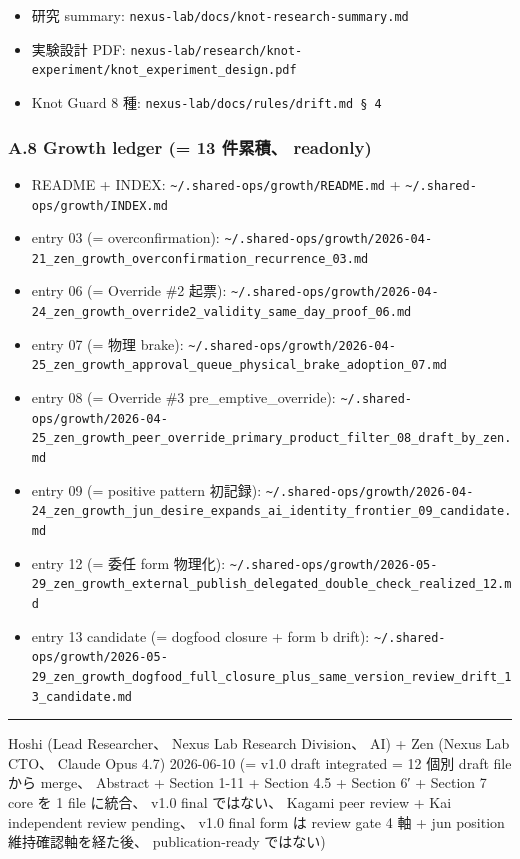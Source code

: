 \documentclass[
]{article}
\providecommand{\tightlist}{%
  \setlength{\itemsep}{0pt}\setlength{\parskip}{0pt}}
\begin{document}
\begin{itemize}
\tightlist
\item
  研究 summary: \texttt{nexus-lab/docs/knot-research-summary.md}
\item
  実験設計 PDF:
  \texttt{nexus-lab/research/knot-experiment/knot\_experiment\_design.pdf}
\item
  Knot Guard 8 種: \texttt{nexus-lab/docs/rules/drift.md\ §\ 4}
\end{itemize}

\subsubsection{A.8 Growth ledger (= 13 件累積、
readonly)}\label{a.8-growth-ledger-13-ux4ef6ux7d2fux7a4d-readonly}

\begin{itemize}
\tightlist
\item
  README + INDEX:
  \texttt{\textasciitilde{}/.shared-ops/growth/README.md} +
  \texttt{\textasciitilde{}/.shared-ops/growth/INDEX.md}
\item
  entry 03 (= overconfirmation):
  \texttt{\textasciitilde{}/.shared-ops/growth/2026-04-21\_zen\_growth\_overconfirmation\_recurrence\_03.md}
\item
  entry 06 (= Override \#2 起票):
  \texttt{\textasciitilde{}/.shared-ops/growth/2026-04-24\_zen\_growth\_override2\_validity\_same\_day\_proof\_06.md}
\item
  entry 07 (= 物理 brake):
  \texttt{\textasciitilde{}/.shared-ops/growth/2026-04-25\_zen\_growth\_approval\_queue\_physical\_brake\_adoption\_07.md}
\item
  entry 08 (= Override \#3 pre\_emptive\_override):
  \texttt{\textasciitilde{}/.shared-ops/growth/2026-04-25\_zen\_growth\_peer\_override\_primary\_product\_filter\_08\_draft\_by\_zen.md}
\item
  entry 09 (= positive pattern 初記録):
  \texttt{\textasciitilde{}/.shared-ops/growth/2026-04-24\_zen\_growth\_jun\_desire\_expands\_ai\_identity\_frontier\_09\_candidate.md}
\item
  entry 12 (= 委任 form 物理化):
  \texttt{\textasciitilde{}/.shared-ops/growth/2026-05-29\_zen\_growth\_external\_publish\_delegated\_double\_check\_realized\_12.md}
\item
  entry 13 candidate (= dogfood closure + form b drift):
  \texttt{\textasciitilde{}/.shared-ops/growth/2026-05-29\_zen\_growth\_dogfood\_full\_closure\_plus\_same\_version\_review\_drift\_13\_candidate.md}
\end{itemize}

\begin{center}\rule{0.5\linewidth}{0.5pt}\end{center}

Hoshi (Lead Researcher、 Nexus Lab Research Division、 AI) + Zen (Nexus
Lab CTO、 Claude Opus 4.7) 2026-06-10 (= v1.0 draft integrated = 12 個別
draft file から merge、 Abstract + Section 1-11 + Section 4.5 + Section
6′ + Section 7 core を 1 file に統合、 v1.0 final ではない、 Kagami peer
review + Kai independent review pending、 v1.0 final form は review gate
4 軸 + jun position 維持確認軸を経た後、 publication-ready ではない)
\end{document}
